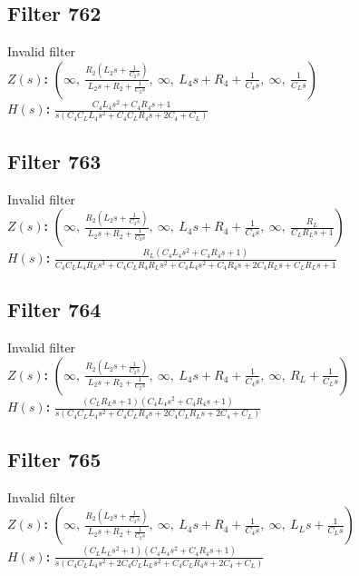 \documentclass{article}
\begin{document}
\subsection*{Filter 762}
Invalid filter \\ 
\textbf{$Z(s)$:} $\left( \infty, \  \frac{R_{2} \left(L_{2} s + \frac{1}{C_{2} s}\right)}{L_{2} s + R_{2} + \frac{1}{C_{2} s}}, \  \infty, \  L_{4} s + R_{4} + \frac{1}{C_{4} s}, \  \infty, \  \frac{1}{C_{L} s}\right)$ \\ 
\textbf{$H(s)$:} $\frac{C_{4} L_{4} s^{2} + C_{4} R_{4} s + 1}{s \left(C_{4} C_{L} L_{4} s^{2} + C_{4} C_{L} R_{4} s + 2 C_{4} + C_{L}\right)}$ \\ 
\subsection*{Filter 763}
Invalid filter \\ 
\textbf{$Z(s)$:} $\left( \infty, \  \frac{R_{2} \left(L_{2} s + \frac{1}{C_{2} s}\right)}{L_{2} s + R_{2} + \frac{1}{C_{2} s}}, \  \infty, \  L_{4} s + R_{4} + \frac{1}{C_{4} s}, \  \infty, \  \frac{R_{L}}{C_{L} R_{L} s + 1}\right)$ \\ 
\textbf{$H(s)$:} $\frac{R_{L} \left(C_{4} L_{4} s^{2} + C_{4} R_{4} s + 1\right)}{C_{4} C_{L} L_{4} R_{L} s^{3} + C_{4} C_{L} R_{4} R_{L} s^{2} + C_{4} L_{4} s^{2} + C_{4} R_{4} s + 2 C_{4} R_{L} s + C_{L} R_{L} s + 1}$ \\ 
\subsection*{Filter 764}
Invalid filter \\ 
\textbf{$Z(s)$:} $\left( \infty, \  \frac{R_{2} \left(L_{2} s + \frac{1}{C_{2} s}\right)}{L_{2} s + R_{2} + \frac{1}{C_{2} s}}, \  \infty, \  L_{4} s + R_{4} + \frac{1}{C_{4} s}, \  \infty, \  R_{L} + \frac{1}{C_{L} s}\right)$ \\ 
\textbf{$H(s)$:} $\frac{\left(C_{L} R_{L} s + 1\right) \left(C_{4} L_{4} s^{2} + C_{4} R_{4} s + 1\right)}{s \left(C_{4} C_{L} L_{4} s^{2} + C_{4} C_{L} R_{4} s + 2 C_{4} C_{L} R_{L} s + 2 C_{4} + C_{L}\right)}$ \\ 
\subsection*{Filter 765}
Invalid filter \\ 
\textbf{$Z(s)$:} $\left( \infty, \  \frac{R_{2} \left(L_{2} s + \frac{1}{C_{2} s}\right)}{L_{2} s + R_{2} + \frac{1}{C_{2} s}}, \  \infty, \  L_{4} s + R_{4} + \frac{1}{C_{4} s}, \  \infty, \  L_{L} s + \frac{1}{C_{L} s}\right)$ \\ 
\textbf{$H(s)$:} $\frac{\left(C_{L} L_{L} s^{2} + 1\right) \left(C_{4} L_{4} s^{2} + C_{4} R_{4} s + 1\right)}{s \left(C_{4} C_{L} L_{4} s^{2} + 2 C_{4} C_{L} L_{L} s^{2} + C_{4} C_{L} R_{4} s + 2 C_{4} + C_{L}\right)}$ \\ 
\end{document}

